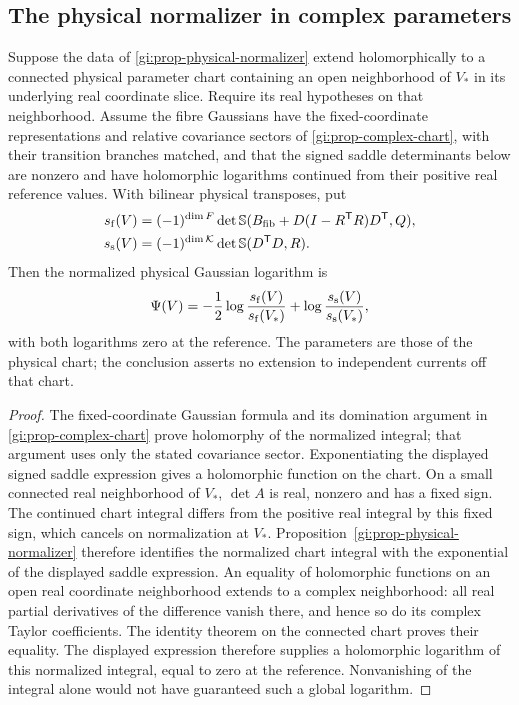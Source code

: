 \documentclass[11pt,letterpaper,reqno]{amsart}
\makeatletter
\numberwithin{equation}{section}
\theoremstyle{definition}
\newcommand{\ms@majorstart}{%
  \pushQED{\qed}\renewcommand{\qedsymbol}{$\blacksquare\square$}}
\newenvironment{corollary}[1][]{\ms@majorstart\ms@corollary[#1]}
  {\popQED\endms@corollary}
\theoremstyle{remark}
\makeatother
\begin{document}
\subsection{The physical normalizer in complex parameters}

\begin{corollary}[Complex physical parameters]
\label{gi:cor-physical-complex}
Suppose the data of \cref{gi:prop-physical-normalizer}
extend holomorphically to a connected physical parameter
chart containing an open neighborhood of $V_*$ in its
underlying real coordinate slice.
Require its real hypotheses on that neighborhood. Assume
the fibre Gaussians have the fixed-coordinate representations
and relative covariance sectors of
\cref{gi:prop-complex-chart}, with their transition branches
matched, and that the signed saddle determinants below
are nonzero and have holomorphic logarithms continued from
their positive real reference values. With bilinear
physical transposes, put
\begin{align*}
 s_{\rm f}(V)&=(-1)^{\dim F}\det\mathbb S
     (B_{\rm fib}+D(I-R^{\mathsf T}R)D^{\mathsf T},Q),\\
 s_{\rm s}(V)&=(-1)^{\dim\mathcal K}\det\mathbb S
                                      (D^{\mathsf T}D,R).
\end{align*}
Then the normalized physical Gaussian logarithm is
\[
 \Psi(V)=-\frac12\log\frac{s_{\rm f}(V)}{s_{\rm f}(V_*)}
                 +\log\frac{s_{\rm s}(V)}{s_{\rm s}(V_*)},
\]
with both logarithms zero at the reference. The parameters
are those of the physical chart; the conclusion asserts
no extension to independent currents off that chart.
\end{corollary}
\begin{proof}
The fixed-coordinate Gaussian formula and its domination
argument in \cref{gi:prop-complex-chart} prove holomorphy
of the normalized integral; that argument uses only the
stated covariance sector. Exponentiating the displayed
signed saddle expression gives a holomorphic function on
the chart. On a small connected real neighborhood of
$V_*$, $\det A$ is real, nonzero and has a fixed sign.
The continued chart integral differs from the positive
real integral by this fixed sign, which cancels on
normalization at $V_*$. Proposition~\ref{gi:prop-physical-normalizer}
therefore identifies the normalized chart integral with
the exponential of the displayed saddle expression.
An equality of holomorphic functions on an open real
coordinate neighborhood extends to a complex neighborhood:
all real partial derivatives of the difference vanish
there, and hence so do its complex Taylor coefficients.
The identity theorem on the connected chart proves their
equality. The displayed expression therefore supplies a
holomorphic logarithm of this normalized integral, equal
to zero at the reference. Nonvanishing of the integral
alone would not have guaranteed such a global logarithm.
\end{proof}
\end{document}
